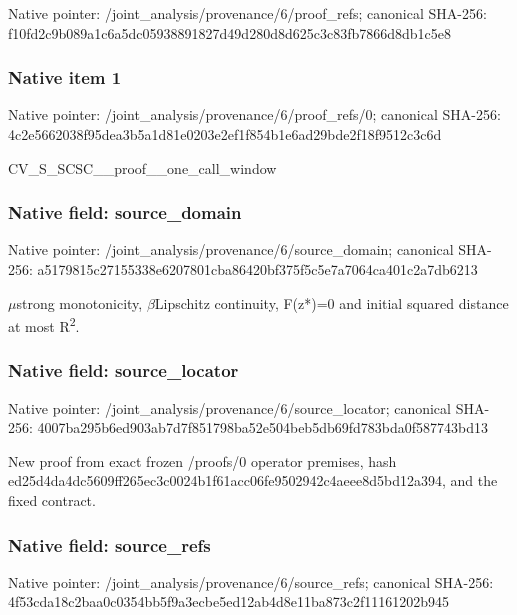 \documentclass[10pt,a4paper]{article}
\begin{document}
Native pointer: /joint\_analysis/provenance/6/proof\_refs; canonical SHA-256: f10fd2c9b089a1c6a5dc0593\allowbreak{}8891827d49d280d8d625c3c8\allowbreak{}3fb7866d8db1c5e8



\subsubsection{Native item 1}


Native pointer: /joint\_analysis/provenan\allowbreak{}ce/6/proof\_refs/0; canonical SHA-256: 4c2e5662038f95dea3b5a1d8\allowbreak{}1e0203e2ef1f854b1e6ad29b\allowbreak{}de2f18f9512c3c6d


CV\_S\_SCSC\_\_proof\_\_one\_call\_window


\subsubsection{Native field: source\_domain}


Native pointer: /joint\_analysis/provenan\allowbreak{}ce/6/source\_domain; canonical SHA-256: a5179815c27155338e620780\allowbreak{}1cba86420bf375f5c5e7a706\allowbreak{}4ca401c2a7db6213


\ensuremath{\mu}strong monotonicity, \ensuremath{\beta}Lipschitz continuity, F(z*)=0 and initial squared distance at most R\textsuperscript{2}.


\subsubsection{Native field: source\_locator}


Native pointer: /joint\_analysis/provenan\allowbreak{}ce/6/source\_locator; canonical SHA-256: 4007ba295b6ed903ab7d7f85\allowbreak{}1798ba52e504beb5db69fd78\allowbreak{}3bda0f587743bd13


New proof from exact frozen /proofs/0 operator premises, hash ed25d4da4dc5609ff265ec3c\allowbreak{}0024b1f61acc06fe9502942c\allowbreak{}4aeee8d5bd12a394, and the fixed contract.


\subsubsection{Native field: source\_refs}


Native pointer: /joint\_analysis/provenan\allowbreak{}ce/6/source\_refs; canonical SHA-256: 4f53cda18c2baa0c0354bb5f\allowbreak{}9a3ecbe5ed12ab4d8e11ba87\allowbreak{}3c2f11161202b945
\end{document}
